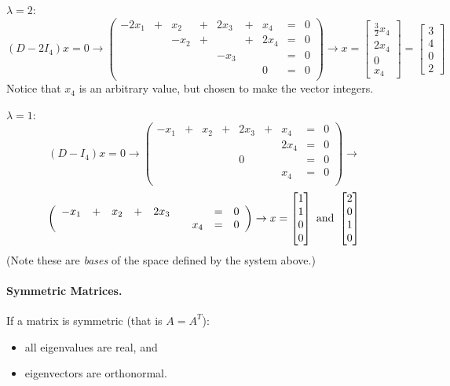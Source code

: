 $\lambda=2$:
\[(D-2I_4)x = 0 \rightarrow \left(\begin{array}{rcrcrcrcr} -2x_1 & + & x_2 & + & 2x_3 & + & x_4 & = & 0\\ &&-x_2 & + &  & + & 2x_4 & = & 0\\ &&&  & -x_3 &&&  = & 0\\ &&& &&& 0& = & 0\\\end{array}\right)\rightarrow x = \begin{bmatrix}\frac{3}{2}x_4\\2x_4\\0\\x_4\end{bmatrix}=\begin{bmatrix}3\\4\\0\\2\end{bmatrix}\]
Notice that $x_4$ is an arbitrary value, but chosen to make the vector integers.  

$\lambda=1$:
\[(D-I_4)x = 0 \rightarrow \left(\begin{array}{rcrcrcrcr} -x_1 & + & x_2 & + & 2x_3 & + & x_4 & = & 0\\ && & &  &  & 2x_4 & = & 0\\ &&&  & 0 &&&  = & 0\\ &&& &&& x_4 & = & 0\\\end{array}\right)\rightarrow\]
\[\left(\begin{array}{rcrcrcrcr}-x_1 & + & x_2 & + & 2x_3 &  &  & = & 0\\ &&& &&& x_4 & = & 0\\\end{array}\right) \rightarrow x = \begin{bmatrix}1\\1\\0\\0\end{bmatrix} \textnormal{ and }\begin{bmatrix}2\\0\\1\\0\end{bmatrix}\]
(Note these are \textit{bases} of the space defined by the system above.)



\paragraph{Symmetric Matrices.}
If a matrix is symmetric (that is $A=A^T$): 
\begin{itemize}
\item all eigenvalues are real, and 
\item eigenvectors are orthonormal. 
\end{itemize}


